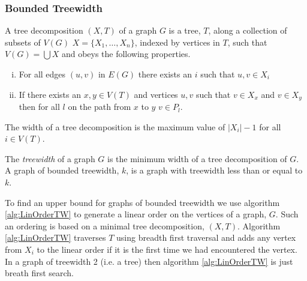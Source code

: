 \subsubsection{Bounded Treewidth}



\begin{definition}
    A tree decomposition $(X,T)$ of a graph $G$ is a tree, $T$, along a collection of subsets of $V(G)$ $X=\{X_1,\dots,X_n\}$, indexed by vertices in $T$, such that $V(G)=\bigcup X$ and obeys the following properties.
    \begin{enumerate}[(i)]
        \item For all edges $(u,v)$ in $E(G)$ there exists an $i$ such that $u,v\in X_i$
        \item  If there exists an $x,y\in V(T)$ and vertices $u,v$ such that $v\in X_x$ and $v\in X_y$ then for all $l$ on the path from $x$ to $y$ $v\in P_l$.
    \end{enumerate} 
    The width of a tree decomposition is the maximum value of $|X_i| -1$ for all $i\in V(T)$.
\end{definition}

\begin{definition}[Treewidth]
    The \textit{treewidth} of a graph $G$ is the minimum width of a tree decomposition of $G$.    
    A graph of bounded treewidth, $k$, is a graph with treewidth less than or equal to $k$. 
\end{definition}

To find an upper bound for graphs of bounded treewidth we use algorithm \ref{alg:LinOrderTW} to generate a linear order on the vertices of a graph, $G$. Such an ordering is based on a minimal tree decomposition, $(X,T)$. Algorithm \ref{alg:LinOrderTW} traverses $T$ using breadth first traversal and adds any vertex from $X_i$ to the linear order if it is the first time we  had encountered the vertex. In a graph of treewidth 2 (i.e. a tree) then algorithm \ref{alg:LinOrderTW} is just breath first search.

